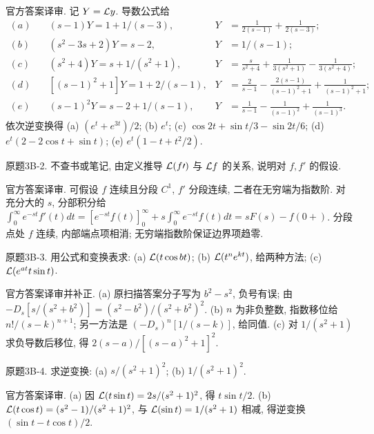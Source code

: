 \begin{solution}
官方答案译审. 记 $Y=\mathcal L y$. 导数公式给\begin{align*}(a)\quad &(s-1)Y=1+1/(s-3),&Y&=\tfrac1{2(s-1)}+\tfrac1{2(s-3)};\\(b)\quad &(s^2-3s+2)Y=s-2,&Y&=1/(s-1);\\(c)\quad &(s^2+4)Y=s+1/(s^2+1),&Y&=\frac{s}{s^2+4}+\frac1{3(s^2+1)}-\frac1{3(s^2+4)};\\(d)\quad &[(s-1)^2+1]Y=1+2/(s-1),&Y&=\frac2{s-1}-\frac{2(s-1)}{(s-1)^2+1}+\frac1{(s-1)^2+1};\\(e)\quad &(s-1)^2Y=s-2+1/(s-1),&Y&=\frac1{s-1}-\frac1{(s-1)^2}+\frac1{(s-1)^3}.\end{align*}依次逆变换得 (a) $(e^t+e^{3t})/2$; (b) $e^t$; (c) $\cos2t+\sin t/3-\sin2t/6$; (d) $e^t(2-2\cos t+\sin t)$; (e) $e^t(1-t+t^2/2)$.
\end{solution}
\begin{exercise}\label{cw:bank-3B-2}
原题3B-2. 不查书或笔记, 由定义推导 $\mathcal L(f\prime)$ 与 $\mathcal L f$ 的关系, 说明对 $f,f\prime$ 的假设.
\end{exercise}
\begin{solution}
官方答案译审. 可假设 $f$ 连续且分段 $C^1$, $f\prime$ 分段连续, 二者在无穷端为指数阶. 对充分大的 $s$, 分部积分给 $\int_0^\infty e^{-st}f\prime(t)dt=[e^{-st}f(t)]_0^\infty+s\int_0^\infty e^{-st}f(t)dt=sF(s)-f(0+)$. 分段点处 $f$ 连续, 内部端点项相消; 无穷端指数阶保证边界项趋零.
\end{solution}
\begin{exercise}\label{cw:bank-3B-3}
原题3B-3. 用公式和变换表求: (a) $\mathcal L(t\cos bt)$; (b) $\mathcal L(t^ne^{kt})$, 给两种方法; (c) $\mathcal L(e^{at}t\sin t)$.
\end{exercise}
\begin{solution}
官方答案译审并补正. (a) 原扫描答案分子写为 $b^2-s^2$, 负号有误; 由 $-D_s[s/(s^2+b^2)]=(s^2-b^2)/(s^2+b^2)^2$. (b) $n$ 为非负整数, 指数移位给 $n!/(s-k)^{n+1}$; 另一方法是 $(-D_s)^n[1/(s-k)]$, 给同值. (c) 对 $1/(s^2+1)$ 求负导数后移位, 得 $2(s-a)/[(s-a)^2+1]^2$.
\end{solution}
\begin{exercise}\label{cw:bank-3B-4}
原题3B-4. 求逆变换: (a) $s/(s^2+1)^2$; (b) $1/(s^2+1)^2$.
\end{exercise}
\begin{solution}
官方答案译审. (a) 因 $\mathcal L(t\sin t)=2s/(s^2+1)^2$, 得 $t\sin t/2$. (b) $\mathcal L(t\cos t)=(s^2-1)/(s^2+1)^2$, 与 $\mathcal L(\sin t)=1/(s^2+1)$ 相减, 得逆变换 $(\sin t-t\cos t)/2$.
\end{solution}
